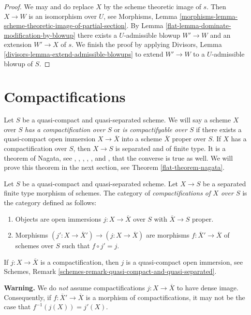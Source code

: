 \begin{proof}

We may and do replace $X$ by the scheme theoretic image of $s$.
Then $X \to W$ is an isomorphism over $U$, see
Morphisms, Lemma
\ref{morphisms-lemma-scheme-theoretic-image-of-partial-section}.
By Lemma \ref{flat-lemma-dominate-modification-by-blowup}
there exists a $U$-admissible blowup $W' \to W$ and an
extension $W' \to X$ of $s$.
We finish the proof by applying
Divisors, Lemma \ref{divisors-lemma-extend-admissible-blowups}
to extend $W' \to W$ to a $U$-admissible blowup of $S$.
\end{proof}

\section{Compactifications}
\label{flat-section-compactify}
Let $S$ be a quasi-compact and quasi-separated scheme. We will say a
scheme $X$ over $S$ {\it has a compactification over $S$}
or {\it is compactifyable over $S$} if there exists
a quasi-compact open immersion $X \to \overline{X}$ into a scheme
$\overline{X}$ proper over $S$. If $X$ has a compactification over
$S$, then $X \to S$ is separated and of finite type. It is a theorem of
Nagata, see \cite{Lutkebohmert}, \cite{Conrad-Nagata}, \cite{Nagata-1},
\cite{Nagata-2}, \cite{Nagata-3}, and \cite{Nagata-4},
that the converse is true as well. We will prove this theorem
in the next section, see Theorem \ref{flat-theorem-nagata}.

\medskip\noindent
Let $S$ be a quasi-compact and quasi-separated scheme.
Let $X \to S$ be a separated finite type morphism of schemes. The category
of {\it compactifications of $X$ over $S$} is the category defined
as follows:
\begin{enumerate}
\item Objects are open immersions $j : X \to \overline{X}$ over $S$ with
$\overline{X} \to S$ proper.
\item Morphisms $(j' : X \to \overline{X}') \to (j : X \to \overline{X})$
are morphisms $f : \overline{X}' \to \overline{X}$ of schemes over $S$
such that $f \circ j' = j$.
\end{enumerate}
If $j : X \to \overline{X}$ is a compactification, then $j$ is a
quasi-compact open immersion, see
Schemes, Remark \ref{schemes-remark-quasi-compact-and-quasi-separated}.

\medskip\noindent
{\bf Warning.} We do {\it not} assume compactifications $j : X \to \overline{X}$
to have dense image. Consequently, if $f : \overline{X}' \to \overline{X}$
is a morphism of compactifications, it may not be the case that
$f^{-1}(j(X)) = j'(X)$.

